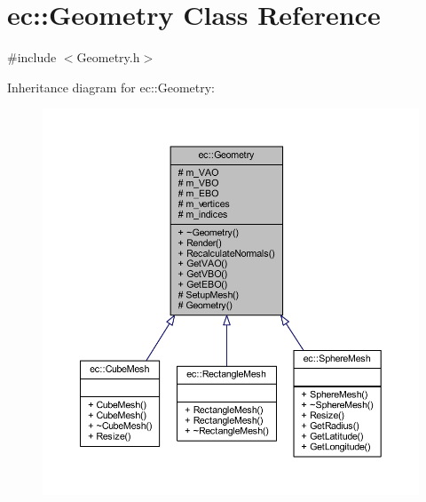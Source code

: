 \hypertarget{classec_1_1_geometry}{}\section{ec\+:\+:Geometry Class Reference}
\label{classec_1_1_geometry}


{\ttfamily \#include $<$Geometry.\+h$>$}



Inheritance diagram for ec\+:\+:Geometry\+:
\nopagebreak
\begin{figure}[H]
\begin{center}
\leavevmode
\includegraphics[width=350pt]{classec_1_1_geometry__inherit__graph}
\end{center}
\end{figure}



